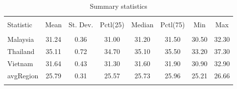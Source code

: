 
\begin{table}[!htbp] \centering 
  \caption{Summary statistics} 
  \label{sumstats} 
\begin{tabular}{@{\extracolsep{5pt}}lccccccc} 
\\[-1.8ex]\hline 
\hline \\[-1.8ex] 
Statistic & \multicolumn{1}{c}{Mean} & \multicolumn{1}{c}{St. Dev.} & \multicolumn{1}{c}{Pctl(25)} & \multicolumn{1}{c}{Median} & \multicolumn{1}{c}{Pctl(75)} & \multicolumn{1}{c}{Min} & \multicolumn{1}{c}{Max} \\ 
\hline \\[-1.8ex] 
Malaysia & 31.24 & 0.36 & 31.00 & 31.20 & 31.50 & 30.50 & 32.30 \\ 
Thailand & 35.11 & 0.72 & 34.70 & 35.10 & 35.50 & 33.20 & 37.30 \\ 
Vietnam & 31.64 & 0.43 & 31.30 & 31.60 & 31.90 & 30.90 & 32.90 \\ 
avgRegion & 25.79 & 0.31 & 25.57 & 25.73 & 25.96 & 25.21 & 26.66 \\ 
\hline \\[-1.8ex] 
\end{tabular} 
\end{table} 
